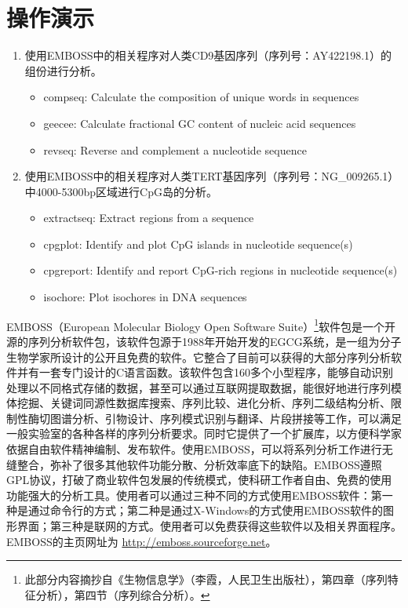 \documentclass[11pt,a4paper,twoside]{book}
\begin{document}
\section{操作演示}
\begin{enumerate}
  \item 使用EMBOSS中的相关程序对人类CD9基因序列（序列号：AY422198.1）的组份进行分析。
    \begin{itemize}
      \item compseq: Calculate the composition of unique words in sequences
      \item geecee: Calculate fractional GC content of nucleic acid sequences
      \item revseq: Reverse and complement a nucleotide sequence
    \end{itemize}
  \item 使用EMBOSS中的相关程序对人类TERT基因序列（序列号：NG\_009265.1）中4000-5300bp区域进行CpG岛的分析。
    \begin{itemize}
      \item extractseq: Extract regions from a sequence
      \item cpgplot: Identify and plot CpG islands in nucleotide sequence(s)
      \item cpgreport: Identify and report CpG-rich regions in nucleotide sequence(s)
      \item isochore: Plot isochores in DNA sequences
    \end{itemize}
\end{enumerate}

EMBOSS（European Molecular Biology Open Software Suite）\footnote{此部分内容摘抄自《生物信息学》（李霞，人民卫生出版社），第四章（序列特征分析），第四节（序列综合分析）。}软件包是一个开源的序列分析软件包，该软件包源于1988年开始开发的EGCG系统，是一组为分子生物学家所设计的公开且免费的软件。它整合了目前可以获得的大部分序列分析软件并有一套专门设计的C语言函数。该软件包含160多个小型程序，能够自动识别处理以不同格式存储的数据，甚至可以通过互联网提取数据，能很好地进行序列模体挖掘、关键词同源性数据库搜索、序列比较、进化分析、序列二级结构分析、限制性酶切图谱分析、引物设计、序列模式识别与翻译、片段拼接等工作，可以满足一般实验室的各种各样的序列分析要求。同时它提供了一个扩展库，以方便科学家依据自由软件精神编制、发布软件。使用EMBOSS，可以将系列分析工作进行无缝整合，弥补了很多其他软件功能分散、分析效率底下的缺陷。EMBOSS遵照GPL协议，打破了商业软件包发展的传统模式，使科研工作者自由、免费的使用功能强大的分析工具。使用者可以通过三种不同的方式使用EMBOSS软件：第一种是通过命令行的方式；第二种是通过X-Windows的方式使用EMBOSS软件的图形界面；第三种是联网的方式。使用者可以免费获得这些软件以及相关界面程序。EMBOSS的主页网址为 \href{http://emboss.sourceforge.net}{http://emboss.sourceforge.net}。
\end{document}
